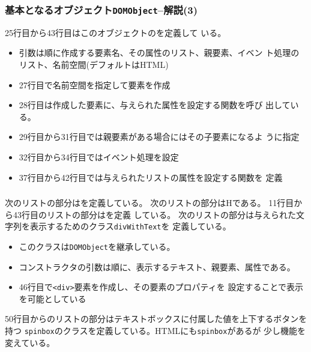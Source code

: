  \begin{frame}[containsverbatim]
  \frametitle{基本となるオブジェクト\texttt{DOMObject}--解説(3)}
 25行目から43行目はこのオブジェクトのを定義して
       いる。
       \begin{itemize}
        \item 引数は順に作成する要素名、その属性のリスト、親要素、イベン
              ト処理のリスト、名前空間(デフォルトはHTML)
        \item 27行目で名前空間を指定して要素を作成
        \item 28行目は作成した要素に、与えられた属性を設定する関数を呼び
              出している。
        \item 29行目から31行目では親要素がある場合にはその子要素になるよ
              うに指定
        \item 32行目から34行目ではイベント処理を設定
        \item 37行目から42行目では与えられたリストの属性を設定する関数を
              定義
       \end{itemize}
 \end{frame}
 \begin{frame}[containsverbatim]
  \frametitle{}
 \end{frame}

 \begin{frame}[containsverbatim]
  \frametitle{}
 \end{frame}
次のリストの部分はを定義している。
次のリストの部分はHである。
11行目から43行目のリストの部分はを定義
している。
次のリストの部分は与えられた文字列を表示するためのクラス\texttt{divWithText}を
定義している。
\begin{itemize}
 \item このクラスは\texttt{DOMObject}を継承している。
 \item コンストラクタの引数は順に、表示するテキスト、親要素、属性である。
 \item 46行目で\texttt{<div>}要素を作成し、その要素のプロパティを
       設定することで表示を可能としている
\end{itemize}

50行目からのリストの部分はテキストボックスに付属した値を上下するボタンを持つ
\texttt{spinbox}のクラスを定義している。HTMLにも\texttt{spinbox}があるが
少し機能を変えている。

